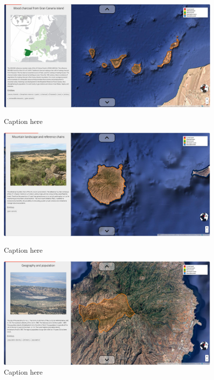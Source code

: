 \begin{figure}[h!tb]
\begin{multicols}{2}
    \includegraphics[width=\linewidth]{img/charcoal1.png}
    \caption{Caption here}\label{fig:charcoal1}\par 
    \includegraphics[width=\linewidth]{img/charcoal2.png}
    \caption{Caption here}\label{fig:charcoal2}\par 
\end{multicols}
\begin{multicols}{2}
    \includegraphics[width=\linewidth]{img/charcoal3.png}
    \caption{Caption here}\label{fig:charcoal3}\par

\end{multicols}
\end{figure}
